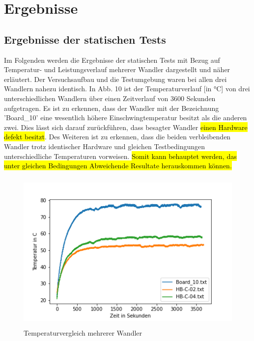 \section{Ergebnisse}


\subsection{Ergebnisse der statischen Tests}
\begin{flushleft}
Im Folgenden werden die Ergebnisse der statischen Tests mit Bezug auf Temperatur- und Leistungsverlauf mehrerer Wandler dargestellt und näher erläutert. Der Versuchsaufbau und die Testumgebung waren bei allen drei Wandlern nahezu identisch. 
In Abb. 10 ist der Temperaturverlauf [in °C] von drei unterschiedlichen Wandlern  über einen Zeitverlauf von 3600 Sekunden aufgetragen. Es ist zu erkennen, dass der Wandler mit der Bezeichnung 'Board\_10' eine wesentlich höhere Einschwingtemperatur besitzt als die anderen zwei. Dies lässt sich darauf zurückführen, dass besagter Wandler \hl{einen Hardware defekt besitzt}. Des Weiteren ist zu erkennen, dass die beiden verbleibenden Wandler trotz identischer Hardware und gleichen Testbedingungen unterschiedliche Temperaturen vorweisen. \hl{Somit kann behauptet werden, das unter gleichen Bedingungen Abweichende Resultate herauskommen können.}
\end{flushleft}

\begin{figure}[H]
    \centering
    \includegraphics[height= 8cm, width = \textwidth]{Pictures/3_Boards_Temp.png}
    \caption{Temperaturvergleich mehrerer Wandler}
\end{figure}


